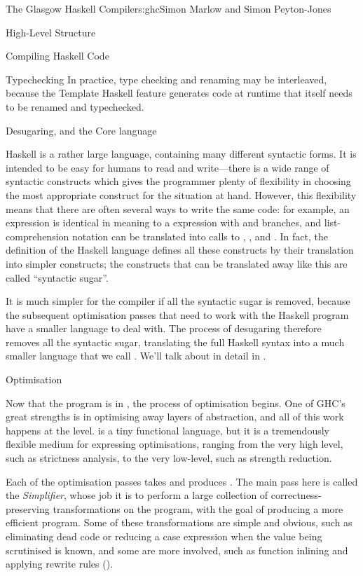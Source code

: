 \begin{aosachapter}{The Glasgow Haskell Compiler}{s:ghc}{Simon Marlow and Simon Peyton-Jones}
\begin{aosasect1}{High-Level Structure}
\begin{aosasect2}{Compiling Haskell Code}
\begin{aosasect3}{Typechecking}
In practice, type checking and renaming may be interleaved, because
the Template Haskell feature generates code at runtime that itself
needs to be renamed and typechecked.

\end{aosasect3}

\begin{aosasect3}{Desugaring, and the Core language}

Haskell is a rather large language, containing many different
syntactic forms.  It is intended to be easy for humans to read and
write---there is a wide range of syntactic constructs which gives the
programmer plenty of flexibility in choosing the most appropriate
construct for the situation at hand.  However, this flexibility means
that there are often several ways to write the same code: for example,
an  expression is identical in meaning to a 
expression with  and  branches, and
list-comprehension notation can be translated into calls to
, , and .  In fact, the definition
of the Haskell language defines all these constructs by their
translation into simpler constructs; the constructs that can be
translated away like this are called ``syntactic sugar''.

It is much simpler for the compiler if all the syntactic sugar is
removed, because the subsequent optimisation passes that need to work
with the Haskell program have a smaller language to deal with.  The
process of desugaring therefore removes all the syntactic sugar,
translating the full Haskell syntax into a much smaller language that
we call .  We'll talk about  in detail in .

\end{aosasect3}

\begin{aosasect3}{Optimisation}

Now that the program is in , the process of optimisation
begins.  One of GHC's great strengths is in optimising away layers of
abstraction, and all of this work happens at the  level.
 is a tiny functional language, but it is a tremendously
flexible medium for expressing optimisations, ranging from the very
high level, such as strictness analysis, to the very low-level, such
as strength reduction.

Each of the optimisation passes takes  and produces
.  The main pass here is called the \emph{Simplifier}, whose job
it is to perform a large collection of correctness-preserving
transformations on the program, with the goal of producing a more
efficient program.  Some of these transformations are simple and
obvious, such as eliminating dead code or reducing a case expression
when the value being scrutinised is known, and some are more involved,
such as function inlining and applying rewrite rules ().


\end{aosasect3}
\end{aosasect2}
\end{aosasect1}
\end{aosachapter}
